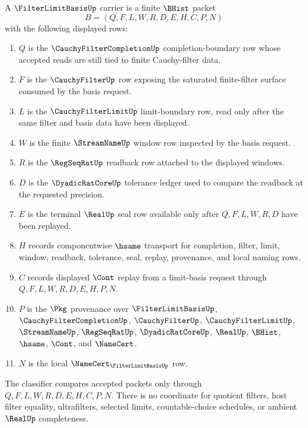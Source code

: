 \begin{definition}
\label{def:filter-limit-basis-carrier}
A $\FilterLimitBasisUp$ carrier is a finite $\BHist$ packet
$$
B=(Q,F,L,W,R,D,E,H,C,P,N)
$$
with the following displayed rows:
\begin{enumerate}
\item $Q$ is the $\CauchyFilterCompletionUp$ completion-boundary row whose accepted reads are still tied to finite Cauchy-filter data.
\item $F$ is the $\CauchyFilterUp$ row exposing the saturated finite-filter surface consumed by the basis request.
\item $L$ is the $\CauchyFilterLimitUp$ limit-boundary row, read only after the same filter and basis data have been displayed.
\item $W$ is the finite $\StreamNameUp$ window row inspected by the basis request.
\item $R$ is the $\RegSeqRatUp$ readback row attached to the displayed windows.
\item $D$ is the $\DyadicRatCoreUp$ tolerance ledger used to compare the readback at the requested precision.
\item $E$ is the terminal $\RealUp$ seal row available only after $Q,F,L,W,R,D$ have been replayed.
\item $H$ records componentwise $\hsame$ transport for completion, filter, limit, window, readback, tolerance, seal, replay, provenance, and local naming rows.
\item $C$ records displayed $\Cont$ replay from a limit-basis request through $Q,F,L,W,R,D,E,H,P,N$.
\item $P$ is the $\Pkg$ provenance over $\FilterLimitBasisUp$, $\CauchyFilterCompletionUp$, $\CauchyFilterUp$, $\CauchyFilterLimitUp$, $\StreamNameUp$, $\RegSeqRatUp$, $\DyadicRatCoreUp$, $\RealUp$, $\BHist$, $\hsame$, $\Cont$, and $\NameCert$.
\item $N$ is the local $\NameCert_{\FilterLimitBasisUp}$ row.
\end{enumerate}
The classifier compares accepted packets only through $Q,F,L,W,R,D,E,H,C,P,N$. There is no coordinate for quotient filters, host filter equality, ultrafilters, selected limits, countable-choice schedules, or ambient $\RealUp$ completeness.
\end{definition}

